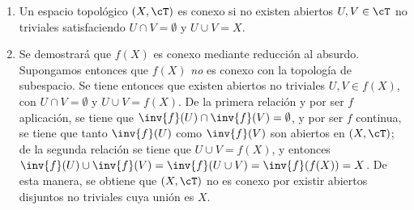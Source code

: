 \begin{solucion}
    \vspace{-1em}
    \begin{enumerate}[label=\alph*)]
        \item Un espacio topológico $(X,\cT)$ es conexo si no existen abiertos $U,V \in \cT$ no triviales satisfaciendo $U \cap V = \emptyset$ y $U \cup V = X$.

        \item Se demostrará que $f(X)$ es conexo mediante reducción al absurdo. Supongamos entonces que $f(X)$ \textit{no} es conexo con la topología de subespacio. Se tiene entonces que existen abiertos no triviales $U,V \in f(X)$, con $U \cap V = \emptyset$ y $U \cup V = f(X)$. De la primera relación y por ser $f$ aplicación, se tiene que $\inv{f}(U) \cap \inv{f}(V) = \emptyset$, y por ser $f$ continua, se tiene que tanto $\inv{f}(U)$ como $\inv{f}(V)$ son abiertos en $(X,\cT)$; de la segunda relación se tiene que $U \cup V = f(X)$, y entonces $\inv{f}(U) \cup \inv{f}(V) = \inv{f}(U \cup V) = \inv{f}(f(X)) = X$. De esta manera, se obtiene que $(X,\cT)$ no es conexo por existir abiertos disjuntos no triviales cuya unión es $X$.
    \end{enumerate}
\end{solucion}





